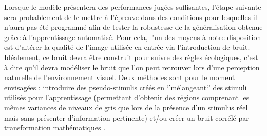Lorsque le modèle présentera des performances jugées suffisantes, l'étape suivante sera probablement de le mettre à l'épreuve dans des conditions pour lesquelles il n'aura pas été programmé afin de tester la robustesse de la généralisation obtenue grâce à l'apprentissage automatisé. Pour cela, l'un des moyens à notre disposition est d'altérer la qualité de l'image utilisée en entrée via l'introduction de bruit. 
Idéalement, ce bruit devra être construit pour suivre des règles écologiques, c'est à dire qu'il devra modéliser le bruit que l'on peut retrouver lors d'une perception naturelle de l'environnement visuel. Deux méthodes sont pour le moment envisagées : introduire des pseudo-stimulis créés en `'mélangeant`' des stimuli utilisés pour l'apprentissage (permettant d'obtenir des régions comprenant les mêmes variances de niveaux de gris que lors de la présence d'un stimulus réel mais sans présenter d'information pertinente) et/ou créer un bruit corrélé par transformation mathématiques \autocite{Najemnik2005}. \\